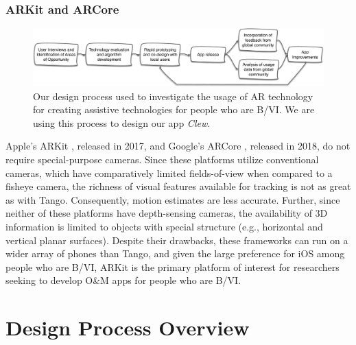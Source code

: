 \documentclass[chi_draft]{sigchi}
\newcommand{\BVI}{B/VI\xspace}
\newcommand{\OM}{O\&M\xspace}
\begin{document}
\subsubsection{ARKit and ARCore}
\begin{figure}
\includegraphics[width=\linewidth]{Figures/designprocess}
\caption{Our design process used to investigate the usage of AR technology for creating assistive technologies for people who are \BVI.  We are using this process to design our app \emph{Clew}.\label{fig:designprocess}}
\end{figure}
Apple's ARKit \cite{arkit}, released in 2017, and Google's ARCore \cite{arcore}, released in 2018, do not require special-purpose cameras.  Since these platforms utilize conventional cameras, which have comparatively limited fields-of-view when compared to a fisheye camera, the richness of visual features available for tracking is not as great as with Tango.  Consequently, motion estimates are less accurate.  Further, since neither of these platforms have depth-sensing cameras, the availability of 3D information is limited to objects with special structure (e.g., horizontal and vertical planar surfaces).  Despite their drawbacks, these frameworks can run on a wider array of phones than Tango, and given the large preference for iOS among people who are \BVI \cite{morris2014blind}, ARKit is the primary platform of interest for researchers seeking to develop \OM apps for people who are \BVI.


\section{Design Process Overview}
\end{document}
